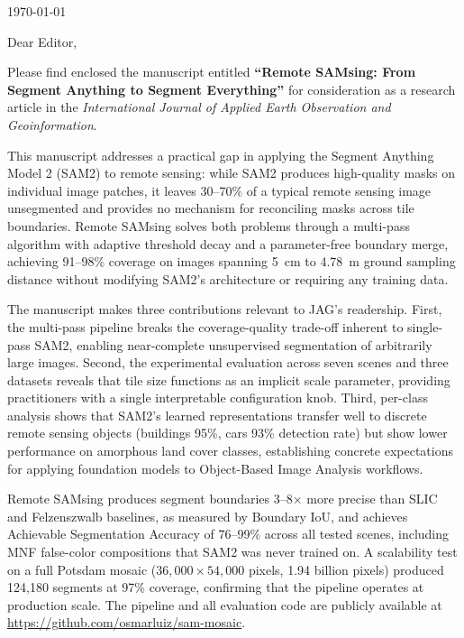 \documentclass[11pt]{article}
\begin{document}
\noindent\today

\vspace{1cm}
\noindent Dear Editor,

\vspace{0.5cm}
\noindent Please find enclosed the manuscript entitled \textbf{``Remote SAMsing: From Segment Anything to Segment Everything''} for consideration as a research article in the \textit{International Journal of Applied Earth Observation and Geoinformation}.

This manuscript addresses a practical gap in applying the Segment Anything Model 2 (SAM2) to remote sensing: while SAM2 produces high-quality masks on individual image patches, it leaves 30--70\% of a typical remote sensing image unsegmented and provides no mechanism for reconciling masks across tile boundaries. Remote SAMsing solves both problems through a multi-pass algorithm with adaptive threshold decay and a parameter-free boundary merge, achieving 91--98\% coverage on images spanning 5~cm to 4.78~m ground sampling distance without modifying SAM2's architecture or requiring any training data.

The manuscript makes three contributions relevant to JAG's readership. First, the multi-pass pipeline breaks the coverage-quality trade-off inherent to single-pass SAM2, enabling near-complete unsupervised segmentation of arbitrarily large images. Second, the experimental evaluation across seven scenes and three datasets reveals that tile size functions as an implicit scale parameter, providing practitioners with a single interpretable configuration knob. Third, per-class analysis shows that SAM2's learned representations transfer well to discrete remote sensing objects (buildings 95\%, cars 93\% detection rate) but show lower performance on amorphous land cover classes, establishing concrete expectations for applying foundation models to Object-Based Image Analysis workflows.

Remote SAMsing produces segment boundaries 3--8$\times$ more precise than SLIC and Felzenszwalb baselines, as measured by Boundary IoU, and achieves Achievable Segmentation Accuracy of 76--99\% across all tested scenes, including MNF false-color compositions that SAM2 was never trained on. A scalability test on a full Potsdam mosaic ($36{,}000 \times 54{,}000$ pixels, 1.94 billion pixels) produced 124{,}180 segments at 97\% coverage, confirming that the pipeline operates at production scale. The pipeline and all evaluation code are publicly available at \url{https://github.com/osmarluiz/sam-mosaic}.
\end{document}

